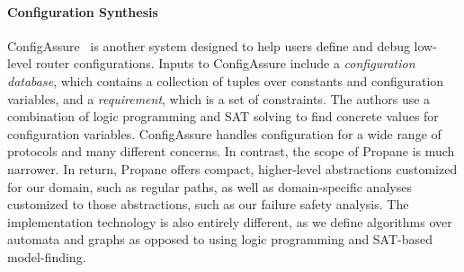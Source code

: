 \documentclass{sig-alternate-10pt}
\newcommand{\sysname}{{\small \sf Propane}\xspace}
\providecommand{\DIFaddbegin}{} %
\begin{document}
\paragraph*{Configuration Synthesis}
ConfigAssure~\cite{narain:lisa05,narain+:configassure}
is another system designed to
help users define and debug low-level router
configurations.  Inputs to
ConfigAssure include a \emph{configuration database}, which contains a
collection of tuples over constants and configuration variables, and a
\emph{requirement}, which is a set of constraints.  
The authors use a combination of logic programming and
SAT solving to find concrete values for configuration variables.
ConfigAssure handles configuration for a wide range of protocols and many
different concerns.  In contrast, the scope of \sysname is much
narrower.  In return, \sysname offers compact, higher-level
abstractions customized for our domain, such as regular paths, as well
as domain-specific analyses customized to those abstractions, such as
our failure safety analysis.  The implementation technology is also
entirely different, as we define algorithms over automata and graphs
as opposed to using logic programming and SAT-based model-finding.




%
%
\DIFaddbegin 
\end{document}
